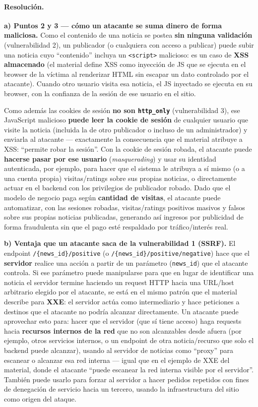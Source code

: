 \paragraph{Resolución.}

\textbf{a) Puntos 2 y 3 --- cómo un atacante se suma dinero de forma maliciosa.}
Como el contenido de una noticia se postea \textbf{sin ninguna validación} (vulnerabilidad
2), un publicador (o cualquiera con acceso a publicar) puede subir una noticia cuyo
``contenido'' incluya un \texttt{<script>} malicioso: es un caso de \textbf{XSS
almacenado} (el material define XSS como inyección de JS que se ejecuta en el browser de
la víctima al renderizar HTML sin escapar un dato controlado por el atacante). Cuando
otro usuario visita esa noticia, el JS inyectado se ejecuta en su browser, con la
confianza de la sesión de ese usuario en el sitio.

Como además las cookies de sesión \textbf{no son \texttt{http\_only}} (vulnerabilidad 3),
ese JavaScript malicioso \textbf{puede leer la cookie de sesión} de cualquier usuario que
visite la noticia (incluida la de otro publicador o incluso de un administrador) y
enviarla al atacante --- exactamente la consecuencia que el material atribuye a XSS:
``permite robar la sesión''. Con la cookie de sesión robada, el atacante puede
\textbf{hacerse pasar por ese usuario} (\emph{masquerading}) y usar su identidad
autenticada, por ejemplo, para hacer que el sistema le atribuya a sí mismo (o a una
cuenta propia) visitas/ratings sobre sus propias noticias, o directamente actuar en el
backend con los privilegios de publicador robado. Dado que el modelo de negocio paga
según \textbf{cantidad de visitas}, el atacante puede automatizar, con las sesiones
robadas, visitas/ratings positivos masivos y falsos sobre sus propias noticias
publicadas, generando así ingresos por publicidad de forma fraudulenta sin que el pago
esté respaldado por tráfico/interés real.

\textbf{b) Ventaja que un atacante saca de la vulnerabilidad 1 (SSRF).}
El endpoint \texttt{/\{news\_id\}/positive} (o \texttt{/\{news\_id\}/positive/negative})
hace que el \textbf{servidor} realice una acción a partir de un parámetro (\texttt{news\_id})
que el atacante controla. Si ese parámetro puede manipularse para que en lugar de
identificar una noticia el servidor termine haciendo un request HTTP hacia una URL/host
arbitrario elegido por el atacante, se está en el mismo patrón que el material describe
para \textbf{XXE}: el servidor actúa como intermediario y hace peticiones a destinos que
el atacante no podría alcanzar directamente. Un atacante puede aprovechar esto para:
hacer que el servidor (que sí tiene acceso) haga requests hacia \textbf{recursos internos
de la red} que no son alcanzables desde afuera (por ejemplo, otros servicios internos, o
un endpoint de otra noticia/recurso que solo el backend puede alcanzar), usando al
servidor de noticias como ``proxy'' para escanear o alcanzar esa red interna --- igual
que en el ejemplo de XXE del material, donde el atacante ``puede escanear la red interna
visible por el servidor''. También puede usarlo para forzar al servidor a hacer pedidos
repetidos con fines de denegación de servicio hacia un tercero, usando la infraestructura
del sitio como origen del ataque.

